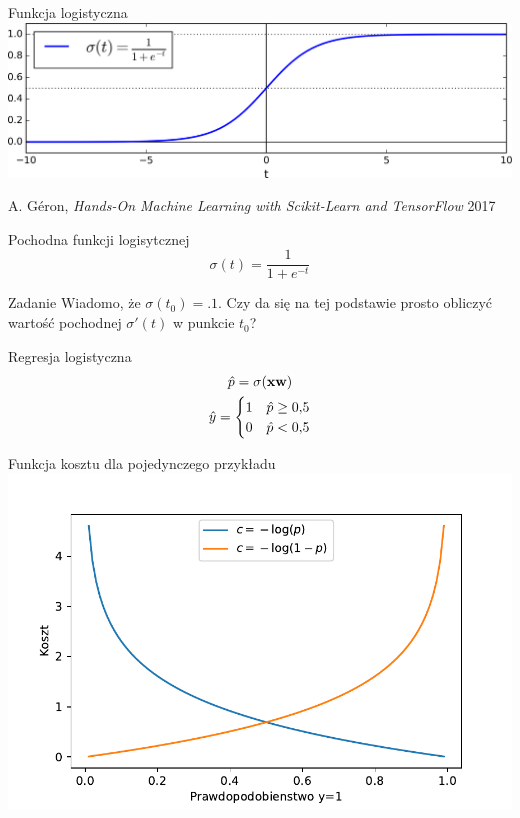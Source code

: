 \documentclass{sa}
\renewcommand{\vec}[1]{\ensuremath\mathbf{#1}}
\begin{document}
\begin{frame}{Funkcja logistyczna}
\includegraphics[width=\textwidth]{logistic-function.png}

{\vfill\footnotesize A. Géron, \emph{Hands-On Machine Learning with Scikit-Learn and TensorFlow} 2017}
\end{frame}

\begin{frame}{Pochodna funkcji logisytcznej}
\[ \sigma(t) = \frac{1}{1+e^{-t}} \]

\begin{block}{Zadanie}
Wiadomo, że $\sigma(t_0)=.1$. Czy da się na tej podstawie prosto obliczyć wartość pochodnej $\sigma'(t)$ w punkcie $t_0$?
\end{block}

\end{frame}

\begin{frame}{Regresja logistyczna}
\begin{gather*}
\hat{p} = \sigma(\vec{x}\vec{w}) \\
\hat{y} = \begin{cases}
1 & \hat{p} \geq 0{,}5 \\
0 &\hat{p} < 0{,}5 \\
\end{cases}
\end{gather*}
\end{frame}

\begin{frame}{Funkcja kosztu dla pojedynczego przykładu}
\includegraphics[width=\textwidth]{logreg-cost-single.pdf}
\end{frame}
\end{document}
